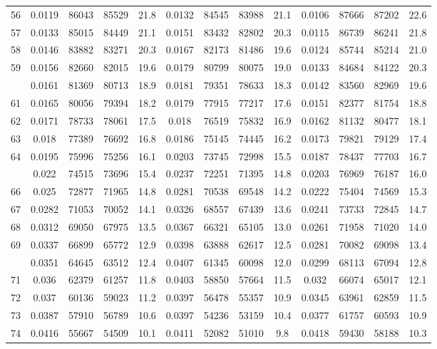 \documentclass[
  14pt,
]{article}
\begin{document}
\begin{longtable}[t]{lcccccccccccc}
56 & 0.0119 & 86043 & 85529 & 21.8 & 0.0132 & 84545 & 83988 & 21.1 & 0.0106 & 87666 & 87202 & 22.6\\
57 & 0.0133 & 85015 & 84449 & 21.1 & 0.0151 & 83432 & 82802 & 20.3 & 0.0115 & 86739 & 86241 & 21.8\\
58 & 0.0146 & 83882 & 83271 & 20.3 & 0.0167 & 82173 & 81486 & 19.6 & 0.0124 & 85744 & 85214 & 21.0\\
59 & 0.0156 & 82660 & 82015 & 19.6 & 0.0179 & 80799 & 80075 & 19.0 & 0.0133 & 84684 & 84122 & 20.3\\
\addlinespace
60 & 0.0161 & 81369 & 80713 & 18.9 & 0.0181 & 79351 & 78633 & 18.3 & 0.0142 & 83560 & 82969 & 19.6\\
61 & 0.0165 & 80056 & 79394 & 18.2 & 0.0179 & 77915 & 77217 & 17.6 & 0.0151 & 82377 & 81754 & 18.8\\
62 & 0.0171 & 78733 & 78061 & 17.5 & 0.018 & 76519 & 75832 & 16.9 & 0.0162 & 81132 & 80477 & 18.1\\
63 & 0.018 & 77389 & 76692 & 16.8 & 0.0186 & 75145 & 74445 & 16.2 & 0.0173 & 79821 & 79129 & 17.4\\
64 & 0.0195 & 75996 & 75256 & 16.1 & 0.0203 & 73745 & 72998 & 15.5 & 0.0187 & 78437 & 77703 & 16.7\\
\addlinespace
65 & 0.022 & 74515 & 73696 & 15.4 & 0.0237 & 72251 & 71395 & 14.8 & 0.0203 & 76969 & 76187 & 16.0\\
66 & 0.025 & 72877 & 71965 & 14.8 & 0.0281 & 70538 & 69548 & 14.2 & 0.0222 & 75404 & 74569 & 15.3\\
67 & 0.0282 & 71053 & 70052 & 14.1 & 0.0326 & 68557 & 67439 & 13.6 & 0.0241 & 73733 & 72845 & 14.7\\
68 & 0.0312 & 69050 & 67975 & 13.5 & 0.0367 & 66321 & 65105 & 13.0 & 0.0261 & 71958 & 71020 & 14.0\\
69 & 0.0337 & 66899 & 65772 & 12.9 & 0.0398 & 63888 & 62617 & 12.5 & 0.0281 & 70082 & 69098 & 13.4\\
\addlinespace
70 & 0.0351 & 64645 & 63512 & 12.4 & 0.0407 & 61345 & 60098 & 12.0 & 0.0299 & 68113 & 67094 & 12.8\\
71 & 0.036 & 62379 & 61257 & 11.8 & 0.0403 & 58850 & 57664 & 11.5 & 0.032 & 66074 & 65017 & 12.1\\
72 & 0.037 & 60136 & 59023 & 11.2 & 0.0397 & 56478 & 55357 & 10.9 & 0.0345 & 63961 & 62859 & 11.5\\
73 & 0.0387 & 57910 & 56789 & 10.6 & 0.0397 & 54236 & 53159 & 10.4 & 0.0377 & 61757 & 60593 & 10.9\\
74 & 0.0416 & 55667 & 54509 & 10.1 & 0.0411 & 52082 & 51010 & 9.8 & 0.0418 & 59430 & 58188 & 10.3\\

\end{longtable}
\end{document}
